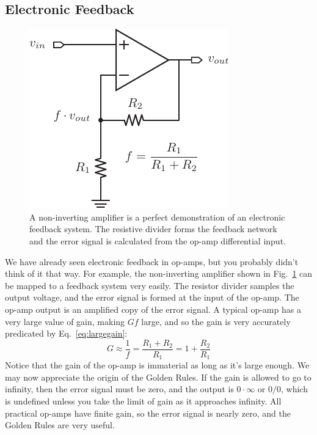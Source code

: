 \subsection{Electronic Feedback}
\begin{figure}[tb]
\centering
\includegraphics[scale=1]{opamp_fb}
\caption{A non-inverting amplifier is a perfect demonstration of an electronic feedback system.  The resistive divider forms the feedback network and the error signal is calculated from the op-amp differential input.}
\label{fig:opamp_fb}
\end{figure}
We have already seen electronic feedback in op-amps, but you probably didn't think of it that way.  For example, the non-inverting amplifier shown in Fig.~\ref{fig:opamp_fb} can be mapped to a feedback system very easily.  The resistor divider samples the output voltage, and the error signal is formed at the input of the op-amp.  The op-amp output is an amplified copy of the error signal.  A typical op-amp has a very large value of gain, making $G f$ large, and so the gain is very accurately predicated by Eq.~\ref{eq:largegain}:
    \begin{equation}
        G \approx \frac{1}{f} = \frac{R_1 + R_2}{R_1} = 1 + \frac{R_2}{R_1}
    \end{equation}
Notice that the gain of the op-amp is immaterial as long as it's large enough.  We may now appreciate the origin of the Golden Rules.  If the gain is allowed to go to infinity, then the error signal must be zero, and the output is $0 \cdot \infty$ or $0/0$, which is undefined unless you take the limit of gain as it approaches infinity.  All practical op-amps have finite gain, so the error signal is nearly zero, and the Golden Rules are very useful.  
